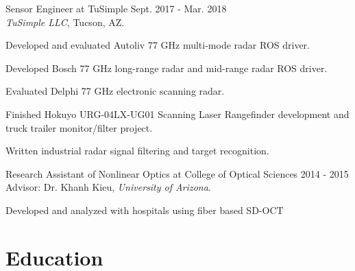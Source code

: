 \documentclass[letterpaper,9pt]{article}
\renewenvironment{itemize}{
  \begin{list}{}{
    \setlength{\topsep}{0pt}
    \setlength{\itemsep}{0pt}
    \setlength{\parsep}{0pt}
    \setlength{\partopsep}{0pt}
    \setlength{\leftmargin}{1.5em}
  }
}{\end{list}}
\begin{document}
\begin{itemize}
  \item Sensor Engineer at TuSimple \hfill Sept. 2017 - Mar. 2018\\
  {\it TuSimple LLC\textsuperscript{\textregistered}}, Tucson, AZ.
  \begin{itemize}
    \item [$\bullet$] Developed and evaluated Autoliv\textsuperscript{\textregistered} 77 GHz multi-mode radar ROS driver.
    \item [$\bullet$] Developed Bosch\textsuperscript{\textregistered} 77 GHz long-range radar and mid-range radar ROS driver.
    \item [$\bullet$] Evaluated Delphi\textsuperscript{\textregistered} 77 GHz electronic scanning radar.
    \item [$\bullet$] Finished Hokuyo\textsuperscript{\textregistered} URG-04LX-UG01 Scanning Laser Rangefinder development and truck trailer monitor/filter project.
    \item [$\bullet$] Written industrial radar signal filtering and target recognition.

  \end{itemize}

  \item Research Assistant of Nonlinear Optics at College of Optical Sciences \hfill 2014 - 2015\\
  Advisor: Dr. Khanh Kieu, {\it University of Arizona}.
  \begin{itemize}
    \item [$\bullet$] Developed and analyzed with hospitals using fiber based SD-OCT
  \end{itemize}




\end{itemize}



\section*{Education}
\end{document}
